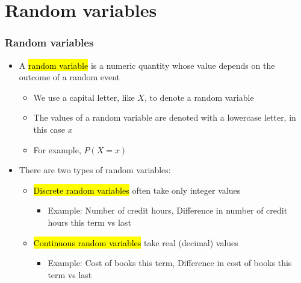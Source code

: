 \documentclass[slidestop,compress,mathserif]{beamer}
\begin{document}

\section{Random variables}


\begin{frame}
\frametitle{Random variables}

\begin{itemize}

\item A \hl{random variable} is a numeric quantity whose value depends on the outcome of a random event
\begin{itemize}
\item We use a capital letter, like $X$, to denote a random variable
\item The values of a random variable are denoted with a lowercase letter, in this case $x$
\item For example, $P(X = x)$
\end{itemize}

\item There are two types of random variables:
\begin{itemize}
\item \hl{Discrete random variables} often take only integer values
\begin{itemize}
\item Example: Number of credit hours, Difference in number of credit hours this term vs last
\end{itemize}
\item \hl{Continuous random variables} take real (decimal) values
\begin{itemize}
\item Example: Cost of books this term, Difference in cost of books this term vs last
\end{itemize}
\end{itemize}

\end{itemize}

\end{frame}

\end{document}
